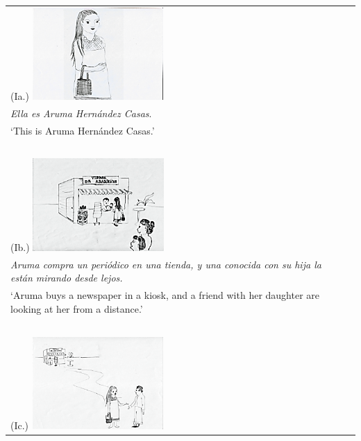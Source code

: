 \documentclass[output=paper]{langsci/langscibook}
\begin{document}
\begin{table}
\begin{tabularx}{\textwidth}{p{5cm}p{6cm}}
\begin{minipage}[t]{5cm}(Ia.)
\includegraphics[width=5cm]{figures/UTH-img7.png}
\end{minipage}& \begin{minipage}[t]{6cm}
\ \\
\textit{Ella es Aruma Hernández Casas}.\\
{‘This is Aruma Hernández Casas.’}
\end{minipage}\\
\ \\
\begin{minipage}[t]{5cm}(Ib.)
\includegraphics[width=5cm]{figures/UTH-img8.png}
\end{minipage}& \begin{minipage}[t]{6cm}
\ \\
\textit{Aruma compra un periódico en una tienda, y una conocida con su hija la están mirando desde lejos.}\\
{‘Aruma buys a newspaper in a kiosk, and a friend with her daughter are looking at her from a distance.’}
\end{minipage}\\
\ \\
\begin{minipage}[t]{5cm}(Ic.)
\includegraphics[width=5cm]{figures/UTH-img9.png}

\end{minipage}
\end{tabularx}
\end{table}
\end{document}
